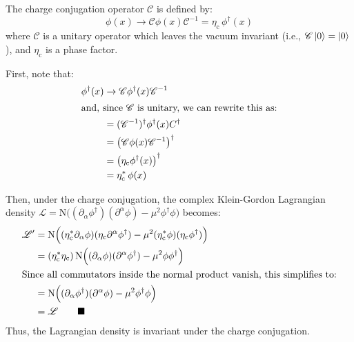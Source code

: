 \documentclass[letterpaper,12pt]{article}
\newenvironment{problem}{\subsection{}\begin{adjustwidth}{0.25in}{}\vspace{-\baselineskip}}{\end{adjustwidth}}
\newcommand{\lagr}{\mathscr{L}}
\newcommand{\done}{\tag*{$\blacksquare$}}
\begin{document}
\begin{problem}
The charge conjugation operator $\mathscr{C}$ is defined by:
\begin{equation*}
	\phi(x) \longrightarrow \mathscr{C}\phi(x)\mathscr{C}^{-1} = \eta_\text{c} \, \phi^\dagger(x)
\end{equation*}
where $\mathscr{C}$ is a unitary operator which leaves the vacuum invariant (i.e., $\mathscr{C}\ket{0} = \ket{0}$), and $\eta_\text{c}$ is a phase factor.

First, note that:
\begin{align*}
	\phi^\dagger(x) &\rightarrow \mathscr{C}\phi^\dagger(x)\mathscr{C}^{-1}	\\
\intertext{and, since $\mathscr{C}$ is unitary, we can rewrite this as:}
	&= (\mathscr{C}^{-1})^\dagger \phi^\dagger(x) C^\dagger	\\
	&= \left(\mathscr{C} \phi(x) \mathscr{C}^{-1}\right)^\dagger	\\
	&= \left(\eta_\text{c} \phi^\dagger(x)\right)^\dagger	\\
	&= \eta_\text{c}^* \, \phi(x)
\end{align*}

Then, under the charge conjugation, the complex Klein-Gordon Lagrangian density $\lagr = \mathrm{N}\Big((\partial_\alpha \phi^\dagger) (\partial^\alpha \phi) - \mu^2 \phi^\dagger\phi\Big)$ becomes:
\begin{align*}
	\lagr' &= \mathrm{N}\Big((\eta^*_\text{c}\partial_\alpha \phi) (\eta_\text{c}\partial^\alpha \phi^\dagger) - \mu^2 (\eta^*_\text{c}\phi)(\eta_\text{c}\phi^\dagger) \Big)	\\
	&= \left(\eta^*_\text{c} \eta_\text{c}\right)
	\mathrm{N}\Big((\partial_\alpha \phi)(\partial^\alpha \phi^\dagger) - \mu^2 \phi\phi^\dagger \Big)	\\
	\intertext{Since all commutators inside the normal product vanish, this simplifies to:}
	&= \mathrm{N}\Big((\partial_\alpha \phi^\dagger) (\partial^\alpha \phi) - \mu^2 \phi^\dagger\phi\Big)		\\
	&= \lagr			\done
\end{align*}
Thus, the Lagrangian density is invariant under the charge conjugation.



\end{problem}
\end{document}
